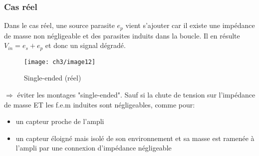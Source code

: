 \subsubsection{Cas réel}
Dans le cas réel, une source parasite \(e_p\) vient s'ajouter car il existe une impédance de masse non négligeable et des parasites induits dans la boucle. Il en résulte \(V_{in} = e_s + e_p\) et donc un signal dégradé.
\begin{figure}[H]
	\centering 
	\texttt{[image: ch3/image12]} 
	\caption{Single-ended (réel)} 
\end{figure}
\(\Rightarrow\) éviter les montages "single-ended". Sauf si la chute de tension sur l'impédance de masse ET les f.e.m induites sont négligeables, comme pour:
\begin{itemize}
	\item un capteur proche de l'ampli
	\item un capteur éloigné mais isolé de son environnement et sa masse est ramenée à l'ampli par une connexion d'impédance négligeable
\end{itemize}
